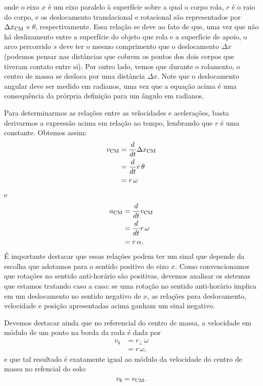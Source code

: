 %
\noindent{}onde o eixo $x$ é um eixo paralelo à superfície sobre a qual o corpo rola, $r$ é o raio do corpo, e os deslocamento translacional e rotacional são representados por $\Delta x_{\rm{CM}}$ e $\theta$, respectivamente. Essa relação se deve ao fato de que, uma vez que não há deslizamento entre a superfície do objeto que rola e a superfície de apoio, o arco percorrido $s$ deve ter o mesmo comprimento que o deslocamento $\Delta x$ (podemos pensar nas distâncias que cobrem os pontos dos dois corpos que tiveram contato entre si). Por outro lado, vemos que durante o rolamento, o centro de massa se desloca por uma distância $\Delta x$. Note que o deslocamento angular deve ser medido em radianos, uma vez que a equação acima é uma consequência da prórpria definição para um ângulo em radianos. 

Para determinarmos as relações entre as velocidades e acelerações, basta derivarmos a expressão acima em relação ao tempo, lembrando que $r$ é uma constante. Obtemos assim:
\begin{align}
    v_{\rm{CM}} &= \frac{d}{dt} \Delta x_{\rm{CM}} \\
    &= \frac{d}{dt} r \, \theta \\
    &= r \, \omega
\end{align}
%
e
\begin{align}
    a_{\rm{CM}} &= \frac{d}{dt} v_{\rm{CM}} \\
    &= \frac{d}{dt} r \, \omega \\
    &= r \, \alpha.
\end{align}
%
É importante destacar que essas relações podem ter um sinal que depende da escolha que adotamos para o sentido positivo do eixo $x$. Como convencionamos que rotações no sentido anti-horário são positivas, devemos analisar os sistemas que estamos tratando caso a caso: se uma rotação no sentido anti-horário implica em um deslocamento no sentido negativo de $x$, as relações para deslocamento, velocidade e posição apresentadas acima ganham um sinal negativo.

Devemos destacar ainda que no referencial do centro de massa, a velocidade em módulo de um ponto na borda da roda é dada por
\begin{align}
    v_b &= r_\perp \, \omega \\
    &= r \, \omega,
\end{align}
%
e que tal resultado é exatamente igual ao módulo da velocidade do centro de massa no refencial do solo:
\begin{equation}
    v_b = v_{\rm{CM}}.
\end{equation}


